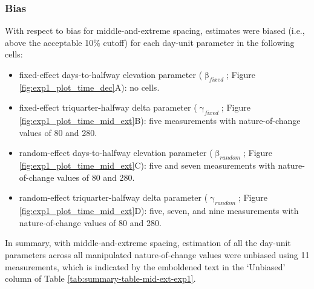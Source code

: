 \documentclass[
12pt, %
twoside,
english]{guelphthesis}
\begin{document}
\hypertarget{bias-mid-ext-exp1}{%
\subsubsection{Bias}\label{bias-mid-ext-exp1}}

With respect to bias for middle-and-extreme spacing, estimates were biased (i.e., above the acceptable 10\% cutoff) for each day-unit parameter in the following cells:
\begin{itemize}
\tightlist
\item
  fixed-effect days-to-halfway elevation parameter (\(\upbeta_{fixed}\); Figure \ref{fig:exp1_plot_time_dec}A): no cells.
\item
  fixed-effect triquarter-halfway delta parameter (\(\upgamma_{fixed}\); Figure \ref{fig:exp1_plot_time_mid_ext}B): five measurements with nature-of-change values of 80 and 280.
\item
  random-effect days-to-halfway elevation parameter (\(\upbeta_{random}\); Figure \ref{fig:exp1_plot_time_mid_ext}C): five and seven measurements with nature-of-change values of 80 and 280.
\item
  random-effect triquarter-halfway delta parameter (\(\upgamma_{random}\); Figure \ref{fig:exp1_plot_time_mid_ext}D): five, seven, and nine measurements with nature-of-change values of 80 and 280.
\end{itemize}
In summary, with middle-and-extreme spacing, estimation of all the day-unit parameters across all manipulated nature-of-change values were unbiased using 11 measurements, which is indicated by the emboldened text in the `Unbiased' column of Table \ref{tab:summary-table-mid-ext-exp1}.
\end{document}
